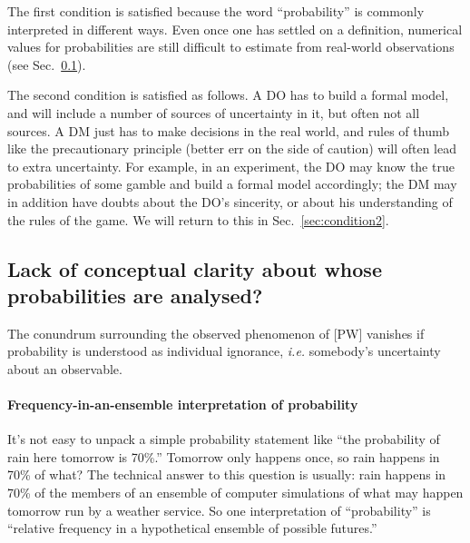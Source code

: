 \documentclass[%
	11pt,
	abstract=true,	
	bibliography=oldstyle					%
]{scrartcl}
\newcommand{\seclabel}[1]{\label{sec:#1}}
\newcommand{\sref}[1]{Sec.~\ref{sec:#1}}
\newcommand{\eg}{\textit{e.g.}\xspace}
\newcommand{\ie}{\textit{i.e.}\xspace}
\numberwithin{equation}{section}
\begin{document}
The first condition is satisfied because the word ``probability'' is commonly interpreted in different ways. Even once one has settled on a definition, numerical values for probabilities are still difficult to estimate from real-world observations (see \sref{tricky}).

The second condition is satisfied as follows. A DO has to build a formal model, and will include a number of sources of uncertainty in it, but often not all sources. A DM just has to make decisions in the real world, and rules of thumb like the precautionary principle (better err on the side of caution) will often lead to extra uncertainty. For example, in an experiment, the DO may know the true probabilities of some gamble and build a formal model accordingly; the DM may in addition have doubts about the DO's sincerity, or about his understanding of the rules of the game. We will return to this in \sref{condition2}.

\subsection{Lack of conceptual clarity about whose probabilities are analysed?} \seclabel{tricky}

The conundrum surrounding the observed phenomenon of [PW] vanishes if probability is understood as individual ignorance, \ie somebody's uncertainty about an observable.

\paragraph{Frequency-in-an-ensemble interpretation of probability}
It's not easy to unpack a simple probability statement like ``the probability of rain here tomorrow is 70\%.'' Tomorrow only happens once, so rain happens in 70\% of what? The technical answer to this question is usually: rain happens in 70\% of the members of an ensemble of computer simulations of what may happen tomorrow run by a weather service. So one interpretation of ``probability'' is ``relative frequency in a hypothetical ensemble of possible futures.'' 
\end{document}
